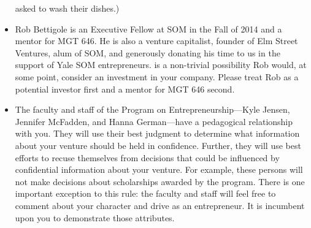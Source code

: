 \begin{itemize}
		asked to wash their dishes.)
	\item Rob Bettigole is an Executive Fellow at SOM in the Fall of 2014
		and a mentor for MGT 646.
		He is also a venture capitalist, founder of Elm Street Ventures,
		alum of SOM, and generously donating his time to us in the support
		of Yale SOM entrepreneurs.
		is a non-trivial possibility Rob would, at some point, consider an
		investment in your company. Please treat Rob as a potential
		investor first and a mentor for MGT 646 second.  
	\item The faculty and staff of the Program on Entrepreneurship---Kyle Jensen,
		Jennifer McFadden, and Hanna
		German---have a pedagogical relationship with you. They will 
		use their best judgment to determine what information about
		your venture should be held in confidence. Further, they will
		use best efforts to recuse themselves from decisions that could
		be influenced by confidential information about your venture.
		For example, these persons will not make decisions about scholarships
		awarded by the program. There is one important exception to this
		rule: the faculty and staff will feel free to comment about your
		character and drive as an entrepreneur. It is incumbent upon you
		to demonstrate those attributes.
\end{itemize}



  